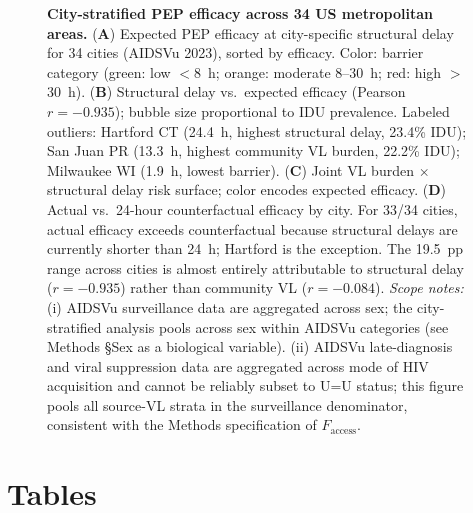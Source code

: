 \documentclass[10pt,letterpaper]{article}
\theoremstyle{definition}
\theoremstyle{remark}
\newcommand{\Faccess}{F_{\text{access}}}
\begin{document}
\begin{figure}[!ht]
\centering

\caption{\textbf{City-stratified PEP efficacy across 34 US metropolitan areas.}
(\textbf{A}) Expected PEP efficacy at city-specific structural delay for 34 cities (AIDSVu 2023), sorted by efficacy. Color: barrier category (green: low $<$8~h; orange: moderate 8--30~h; red: high $>$30~h).
(\textbf{B}) Structural delay vs.\ expected efficacy (Pearson $r = -0.935$); bubble size proportional to IDU prevalence. Labeled outliers: Hartford CT (24.4~h, highest structural delay, 23.4\% IDU); San Juan PR (13.3~h, highest community VL burden, 22.2\% IDU); Milwaukee WI (1.9~h, lowest barrier).
(\textbf{C}) Joint VL burden $\times$ structural delay risk surface; color encodes expected efficacy.
(\textbf{D}) Actual vs.\ 24-hour counterfactual efficacy by city. For 33/34 cities, actual efficacy exceeds counterfactual because structural delays are currently shorter than 24~h; Hartford is the exception. The 19.5~pp range across cities is almost entirely attributable to structural delay ($r = -0.935$) rather than community VL ($r = -0.084$). \textit{Scope notes:} (i) AIDSVu surveillance data are aggregated across sex; the city-stratified analysis pools across sex within AIDSVu categories (see Methods §Sex as a biological variable). (ii) AIDSVu late-diagnosis and viral suppression data are aggregated across mode of HIV acquisition and cannot be reliably subset to U=U status; this figure pools all source-VL strata in the surveillance denominator, consistent with the Methods specification of $\Faccess$.}
\label{fig:city}
\end{figure}


\clearpage
\section*{Tables}
\end{document}
